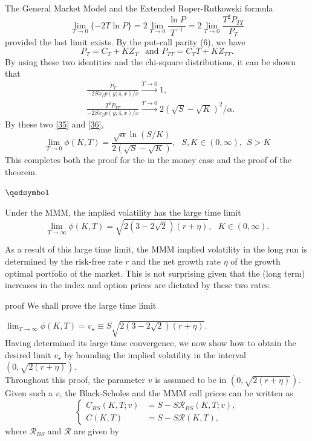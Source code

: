 \documentclass[unknownkeysallowed, compress]{beamer}
\theoremstyle{plain}
\begin{document}
\begin{frame}[allowframebreaks]{The General Market Model and the Extended Roper-Rutkowski formula}
\begin{equation}\label{36}
\lim_{T\rightarrow 0}\{-2T\ln P\} = 2\lim_{T\rightarrow 0}\frac{\ln P}{T^{-1}} = 2\lim_{T\rightarrow 0}\frac{T^2P_{TT}}{P_T}
\end{equation}
provided the last limit exists. By the put-call parity (6), we have
$$
P_T = C_T+KZ_T~~\mbox{  and  } P_{TT} = C_TT+KZ_{TT}.
$$
By using these two identities and the chi-square distributions, it can be shown that
\begin{align*}
&\frac{P_T}{-2Sx_Tp(y;4,x)/x}\stackrel{T\rightarrow 0}{\longrightarrow}1,\\
&\frac{T^2P_{TT}}{-2Sx_Tp(y;4,x)/x}\stackrel{T\rightarrow 0}{\longrightarrow} 2(\sqrt{S} - \sqrt{K})^2/\alpha.
\end{align*}
By these two \eqref{35} and \eqref{36},
$$
\lim_{T\rightarrow 0}\phi(K,T) = \frac{\sqrt{\alpha}\ln(S/K)}{2(\sqrt{S} - \sqrt{K})},~~~S,K\in(0,\infty),~~S>K
$$
This completes both the proof for the in the money case and the proof of the theorem.
\begin{flushright}
$\qedsymbol$
\end{flushright}

\begin{theorem}\cite[pg.~11]{guo2011small}
Under the MMM, the implied volatility has the large time limit
\begin{equation}\label{12}
\lim_{T\rightarrow \infty}\phi(K,T) = \sqrt{2(3-2\sqrt{2})(r+\eta)},~~~K\in (0,\infty).
\end{equation}
\end{theorem}
As a result of this large time limit, the MMM implied volatility in the long run is
determined by the risk-free rate $r$ and the net growth rate $\eta$ of the growth optimal portfolio
of the market. This is not surprising given that the (long term) increases in the index and
option prices are dictated by these two rates.
\begin{block}{proof}
We shall prove the large time limit
\end{block}
$\lim_{T\rightarrow \infty}\phi(K,T) = v_\star\equiv S\sqrt{2(3-2\sqrt{2})(r+\eta)}$.\\
Having determined its large time convergence, we now show how to obtain the desired
limit $v_\star$ by bounding the implied volatility in the interval $(0,\sqrt{2(r+\eta)})$.\\
Throughout this proof, the parameter $v$ is assumed to be in $(0,\sqrt{2(r+\eta)})$. Given such a $v$, the Black-Scholes and the MMM call prices can be written as
\begin{equation}\label{37}
\left\{
\begin{split}
C_{BS}(K,T;v)& = S-S\mathcal{R}_{BS}(K,T;v),\\
C(K,T)& = S-S\mathcal{R}(K,T),
\end{split}
\right.
\end{equation}
where $\mathcal{R}_{BS}$ and $\mathcal{R}$ are given by


\end{frame}
\end{document}
